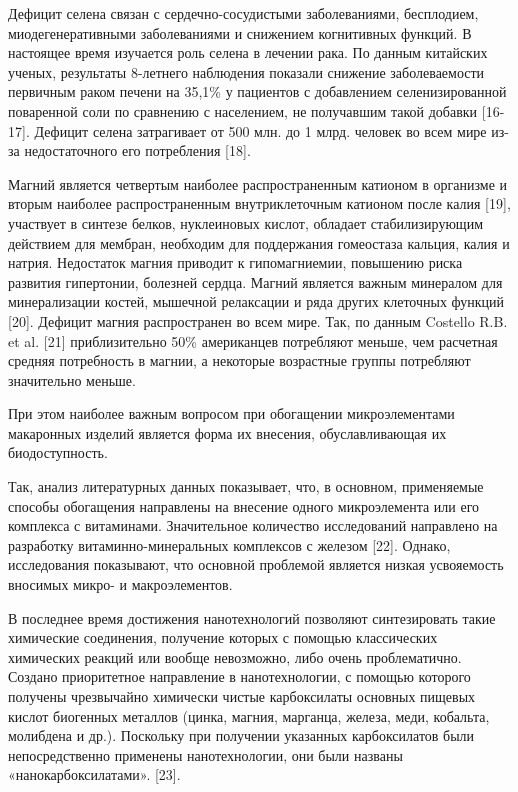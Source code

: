Дефицит селена связан с сердечно-сосудистыми заболеваниями, бесплодием,
миодегенеративными заболеваниями и снижением когнитивных функций. В
настоящее время изучается роль селена в лечении рака. По данным
китайских ученых, результаты 8-летнего наблюдения показали снижение
заболеваемости первичным раком печени на 35,1\% у пациентов с
добавлением селенизированной поваренной соли по сравнению с населением,
не получавшим такой добавки {[}16-17{]}. Дефицит селена затрагивает от
500 млн. до 1 млрд. человек во всем мире из-за недостаточного его
потребления {[}18{]}.

Магний является четвертым наиболее распространенным катионом в организме
и вторым наиболее распространенным внутриклеточным катионом после калия
{[}19{]}, участвует в синтезе белков, нуклеиновых кислот, обладает
стабилизирующим действием для мембран, необходим для поддержания
гомеостаза кальция, калия и натрия. Недостаток магния приводит к
гипомагниемии, повышению риска развития гипертонии, болезней сердца.
Магний является важным минералом для минерализации костей, мышечной
релаксации и ряда других клеточных функций {[}20{]}. Дефицит магния
распространен во всем мире. Так, по данным Costello R.B. et al. {[}21{]}
приблизительно 50\% американцев потребляют меньше, чем расчетная средняя
потребность в магнии, а некоторые возрастные группы потребляют
значительно меньше.

При этом наиболее важным вопросом при обогащении микроэлементами
макаронных изделий является форма их внесения, обуславливающая их
биодоступность.

Так, анализ литературных данных показывает, что, в основном, применяемые
способы обогащения направлены на внесение одного микроэлемента или его
комплекса с витаминами. Значительное количество исследований направлено
на разработку витаминно-минеральных комплексов с железом {[}22{]}.
Однако, исследования показывают, что основной проблемой является низкая
усвояемость вносимых микро- и макроэлементов.

В последнее время достижения нанотехнологий позволяют синтезировать
такие химические соединения, получение которых с помощью классических
химических реакций или вообще невозможно, либо очень проблематично.
Создано приоритетное направление в нанотехнологии, с помощью которого
получены чрезвычайно химически чистые карбоксилаты основных пищевых
кислот биогенных металлов (цинка, магния, марганца, железа, меди,
кобальта, молибдена и др.). Поскольку при получении указанных
карбоксилатов были непосредственно применены нанотехнологии, они были
названы «нанокарбоксилатами». {[}23{]}.


